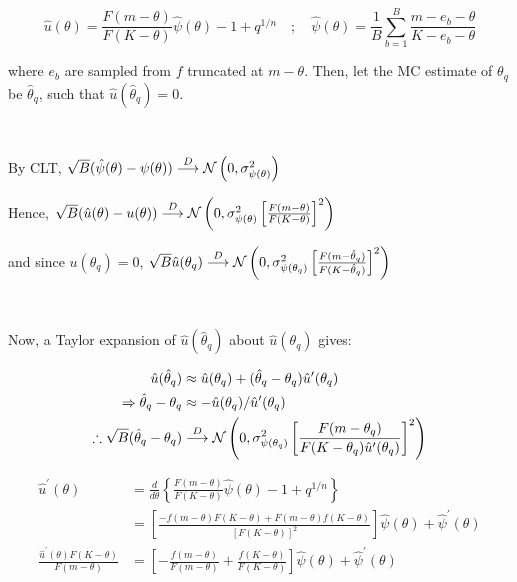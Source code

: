 \begin{equation}
    \hat{u}(\theta) = \frac{F(m - \theta)}{F(K - \theta)} \hat\psi(\theta) - 1 + q^{1/n} \quad;\quad \hat\psi(\theta) = \frac{1}{B} \sum_{b=1}^B \frac{m-e_b-\theta}{K-e_b-\theta}
\end{equation}

where $e_b$ are sampled from $f$ truncated at $m-\theta$. Then, let the MC estimate of $\theta_q$ be $\hat\theta_q$, such that $\hat{u}(\hat\theta_q) = 0$. 

\

By CLT, $\sqrt{B} (\hat\psi(\theta) - \psi(\theta) ) \overset{D}{\longrightarrow} \mathcal{N} \left( 0, \sigma^2_{\psi(\theta)} \right)$

Hence, $\sqrt{B} (\hat{u}(\theta) - u(\theta) ) \overset{D}{\longrightarrow} \mathcal{N} \left( 0, \sigma^2_{\psi(\theta)} \left[ \frac{F(m - \theta)}{F(K - \theta)} \right]^2 \right)$

and since $u(\theta_q) = 0$, $\sqrt{B} \hat{u}(\theta_q) \overset{D}{\longrightarrow} \mathcal{N} \left( 0, \sigma^2_{\psi(\theta_q)} \left[ \frac{F(m - \hat\theta_q)}{F(K - \hat\theta_q)} \right]^2 \right)$

\

Now, a Taylor expansion of $\hat{u}(\hat\theta_q)$ about $\hat{u}(\theta_q)$ gives:

\begin{align}
    \hat{u}(\hat\theta_q) &\approx \hat{u}(\theta_q) + (\hat\theta_q - \theta_q)\hat{u}^\prime (\theta_q) \\
    \Rightarrow \hat\theta_q - \theta_q &\approx - \hat{u}(\theta_q)/\hat{u}^\prime (\theta_q) \\
    \therefore \sqrt{B} (\hat\theta_q - \theta_q) &\overset{D}{\longrightarrow}  \mathcal{N} \left( 0, \sigma^2_{\psi(\theta_q)} \left[ \frac{F(m - \theta_q)}{F(K - \theta_q)\hat{u}^\prime (\theta_q)} \right]^2 \right)
\end{align}

\begin{align}
    \hat{u}^\prime (\theta)
        &= \frac{d}{d\theta} \left\{ \frac{F(m - \theta)}{F(K - \theta)} \hat\psi(\theta) - 1 + q^{1/n} \right\} \\
        &= \left[ \frac{-f(m - \theta)F(K-\theta) + F(m - \theta)f(K-\theta)}{[F(K - \theta)]^2} \right] \hat\psi(\theta) + \hat\psi^\prime(\theta) \\
    \frac{\hat{u}^\prime (\theta) F(K - \theta)}{F(m - \theta)}
        &= \left[ - \frac{f(m - \theta)}{F(m - \theta)} + \frac{f(K - \theta)}{F(K - \theta)} \right] \hat\psi(\theta) + \hat\psi^\prime(\theta)
\end{align}

